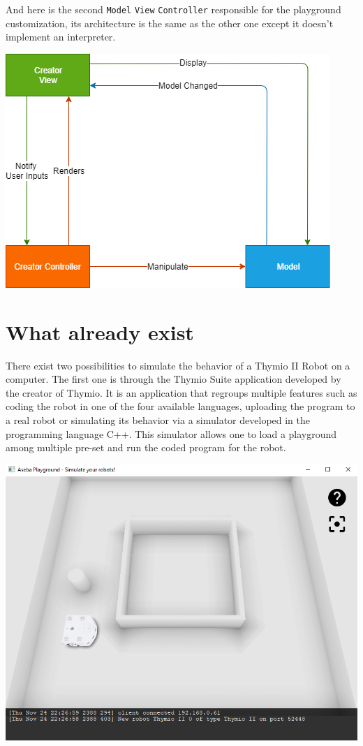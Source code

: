 \documentclass{scrbook}
\begin{document}
And here is the second \texttt{Model} \texttt{View} \texttt{Controller} responsible for the playground customization, its architecture is the same as the other one except it doesn't implement an interpreter. 
\begin{center}
  \includegraphics[width=\textwidth]{./architecture_proposal-Page-2}
\end{center}

\chapter{What already exist} 

There exist two possibilities to simulate the behavior of a Thymio II Robot on a computer. 
The first one is through the Thymio Suite application developed by the creator of Thymio. 
It is an application that regroups multiple features such as coding the robot in one of the four available languages, 
uploading the program to a real robot or simulating its behavior via a simulator developed in the programming language C++. 
This simulator allows one to load a playground among multiple pre-set and run the coded program for the robot.

\begin{center}
  \includegraphics[width=\textwidth]{./suite_simulator}
\end{center}
\end{document}
